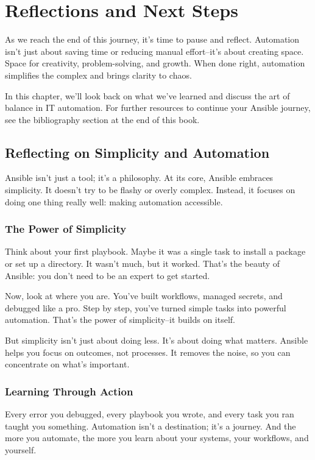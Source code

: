 \chapter{Reflections and Next Steps}

As we reach the end of this journey, it's time to pause and reflect. Automation isn't just about saving time or reducing manual effort--it's about creating space. Space for creativity, problem-solving, and growth. When done right, automation simplifies the complex and brings clarity to chaos.

In this chapter, we'll look back on what we've learned and discuss the art of balance in IT automation. For further resources to continue your Ansible journey, see the bibliography section at the end of this book.



\section{Reflecting on Simplicity and Automation}

Ansible isn't just a tool; it's a philosophy. At its core, Ansible embraces simplicity. It doesn't try to be flashy or overly complex. Instead, it focuses on doing one thing really well: making automation accessible.

\subsection{The Power of Simplicity}

Think about your first playbook. Maybe it was a single task to install a package or set up a directory. It wasn't much, but it worked. That's the beauty of Ansible: you don't need to be an expert to get started.

Now, look at where you are. You've built workflows, managed secrets, and debugged like a pro. Step by step, you've turned simple tasks into powerful automation. That's the power of simplicity--it builds on itself.

But simplicity isn't just about doing less. It's about doing what matters. Ansible helps you focus on outcomes, not processes. It removes the noise, so you can concentrate on what's important.

\subsection{Learning Through Action}

Every error you debugged, every playbook you wrote, and every task you ran taught you something. Automation isn't a destination; it's a journey. And the more you automate, the more you learn about your systems, your workflows, and yourself.

